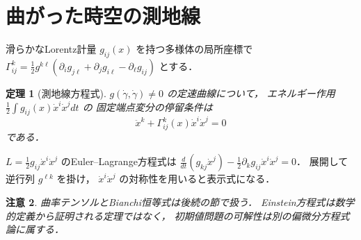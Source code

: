 \documentclass[a5paper,10pt,onecolumn]{jsarticle}
\makeatletter
\theoremstyle{mathnotetheorem}
\newtheorem{theorem}{定理}[section]
\newtheorem{remark}[theorem]{注意}
\renewcommand{\proofname}{証明}
\renewenvironment{proof}[1][\proofname]{%
  \par\pushQED{\qed}\normalfont\topsep4\p@\@plus2\p@\relax
  \trivlist\item[\hskip\labelsep\bfseries #1]\ignorespaces
}{\popQED\endtrivlist\@endpefalse}
\makeatother
\begin{document}
\section{曲がった時空の測地線}
滑らかなLorentz計量 $g_{ij}(x)$ を持つ多様体の局所座標で
$\Gamma^k_{ij}=\frac12g^{k\ell}(\partial_i g_{j\ell}
+\partial_jg_{i\ell}-\partial_\ell g_{ij})$ とする．
\begin{theorem}[測地線方程式]
$g(\dot\gamma,\dot\gamma)\ne0$ の定速曲線について，
エネルギー作用 $\frac12\int g_{ij}(x)\dot x^i\dot x^jdt$ の
固定端点変分の停留条件は
\[
 \ddot x^k+\Gamma^k_{ij}(x)\dot x^i\dot x^j=0
\]
である．
\end{theorem}
\begin{proof}
$L=\frac12g_{ij}\dot x^i\dot x^j$ のEuler--Lagrange方程式は
$\frac d{dt}(g_{kj}\dot x^j)-\frac12\partial_k g_{ij}\dot x^i\dot x^j=0$．
展開して逆行列 $g^{\ell k}$ を掛け，
$\dot x^i\dot x^j$ の対称性を用いると表示式になる．
\end{proof}
\begin{remark}
曲率テンソルとBianchi恒等式は後続の節で扱う．
Einstein方程式は数学的定義から証明される定理ではなく，
初期値問題の可解性は別の偏微分方程式論に属する．
\end{remark}
\end{document}
